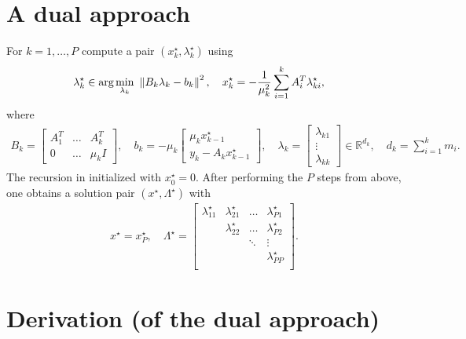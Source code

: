 \documentclass[12pt]{article}
\begin{document}
\section{A dual approach}

For $k=1,\dots,P$ compute a pair $(x_k^{\star},\lambda_{k}^{\star})$ using
%
\begin{align*}
\lambda_k^{\star} \in \mbox{arg} \min_{\lambda_{k}} \  & \left\lVert B_k\lambda_{k} - b_k\right\rVert^2, \quad
x_k^{\star} = -\frac{1}{\mu_k^2}\sum_{i=1}^{k}A_i^T\lambda_{ki}^{\star},
\end{align*}
%
where
%
\begin{align*}
B_k = \begin{bmatrix}A_1^T & \dots & A_k^T \\ 0 & \dots & \mu_kI \end{bmatrix}, \quad
b_k = -\mu_k\begin{bmatrix} \mu_k x_{k-1}^{\star} \\ y_k - A_kx_{k-1}^{\star} \end{bmatrix}, \quad
\lambda_{k} = \begin{bmatrix} \lambda_{k1} \\ \vdots \\ \lambda_{kk} \end{bmatrix} \in \mathbb{R}^{d_k}, \quad
d_k = \sum_{i=1}^{k}m_i.
\end{align*}
%
The recursion in initialized with $x_0^{\star} = 0$. After performing the $P$ steps from above, one
obtains a solution pair $(x^{\star}, \Lambda^{\star})$ with
%
\begin{align*}
x^{\star} = x_P^{\star}, \quad
\Lambda^{\star} =
\begin{bmatrix}
  \lambda_{11}^{\star} & \lambda_{21}^{\star} & \dots  &\lambda_{P1}^{\star} \\
                       & \lambda_{22}^{\star} & \dots  &\lambda_{P2}^{\star} \\
                       &                      & \ddots & \vdots \\
                       &                      &        &\lambda_{PP}^{\star} \\
\end{bmatrix}.
\end{align*}

\newpage

\section{Derivation (of the dual approach)}
\end{document}
